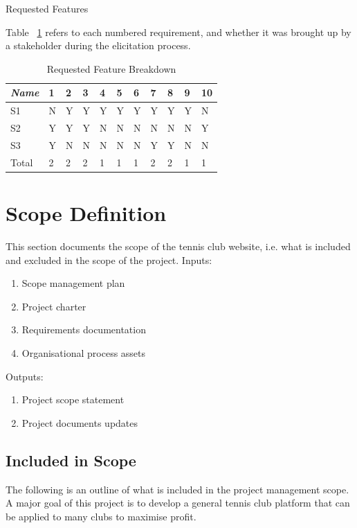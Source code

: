 \begin{table}[H]
\label{fig:requirementsFeatures}
\caption{Requested Features}
\end{table}
Table ~\ref{fig:reqbreakdown} refers to each numbered requirement, and whether it was brought up by a stakeholder during the elicitation process.
\begin{table}[H]
\caption{Requested Feature Breakdown}
\begin{center}
    \begin{tabular}{ | l | l | l | l| l| l| l| l| l|l| p{.22cm} |}
    \hline
     \textit{Name}& 1& 2 & 3 & 4 & 5 & 6 & 7 & 8 & 9 & 10\\ \hline
	 S1 & N & Y & Y & Y & Y & Y & Y & Y & Y & N\\ \hline
	 S2 & Y & Y & Y & N & N & N & N & N & N & Y\\ \hline
	 S3 & Y & N & N & N & N & N & Y & Y & N & N\\ \hline
  Total & 2 & 2 & 2 & 1 & 1 & 1 & 2 & 2 & 1 & 1\\ \hline
    \end{tabular}
\end{center}
\label{fig:reqbreakdown}
\end{table}


\section{Scope Definition}

This section documents the scope of the tennis club website, i.e. what is included and excluded in the scope of the project.
Inputs:
\begin{enumerate}
\item Scope management plan
\item Project charter
\item Requirements documentation
\item Organisational process assets
\end{enumerate}

Outputs:
\begin{enumerate}
\item Project scope statement
\item Project documents updates
\end{enumerate}
\subsection{Included in Scope}

The following is an outline of what is included in the project management scope. A major goal of this project is to develop a general tennis club platform that can be applied to many clubs to maximise profit.

